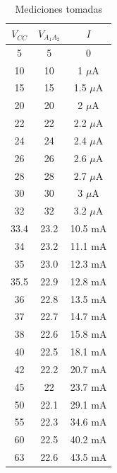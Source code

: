 \begin{minipage}[t]{0.5\linewidth}
  \begin{table}[H] %
    \begin{center}
      \begin{tabular}{c|c|c}
        $V_{CC}$ &$V_{A_1A_2}$ &$I$  \\
        \hline
        5     &5    &0     \\
        10    &10   &1    $\mu$A\\
        15    &15   &1.5  $\mu$A\\
        20    &20   &2    $\mu$A\\
        22    &22   &2.2  $\mu$A\\
        24    &24   &2.4  $\mu$A\\
        26    &26   &2.6  $\mu$A\\
        28    &28   &2.7  $\mu$A\\
        30    &30   &3    $\mu$A\\
        32    &32   &3.2  $\mu$A\\
        33.4  &23.2 &10.5 mA\\
        34    &23.2 &11.1 mA\\
        35    &23.0 &12.3 mA\\
        35.5  &22.9 &12.8 mA\\
        36    &22.8 &13.5 mA\\
        37    &22.7 &14.7 mA\\
        38    &22.6 &15.8 mA\\
        40    &22.5 &18.1 mA\\
        42    &22.2 &20.7 mA\\
        45    &22   &23.7 mA \\
        50    &22.1 &29.1 mA \\
        55    &22.3 &34.6 mA \\
        60    &22.5 &40.2 mA \\
        63    &22.6 &43.5 mA \\
      \end{tabular}
    \end{center} 
    \caption{Mediciones tomadas}
  \end{table}
\end{minipage}
